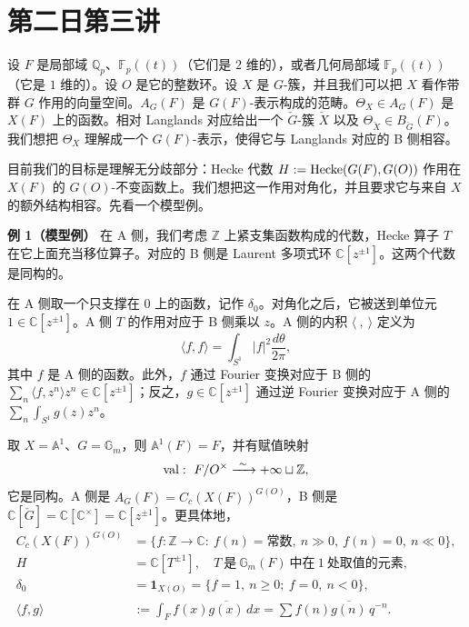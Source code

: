 \section{第二日第三讲}

设 $F$ 是局部域 $\mathbb Q_p$、$\mathbb F_p((t))$（它们是 $2$ 维的），或者几何局部域 $\mathbb F_p((t))$（它是 $1$ 维的）。设 $O$ 是它的整数环。设 $X$ 是 $G$-簇，并且我们可以把 $X$ 看作带群 $G$ 作用的向量空间。$A_G(F)$ 是 $G(F)$-表示构成的范畴。$\Theta_X\in A_G(F)$ 是 $X(F)$ 上的函数。相对 Langlands 对应给出一个 $\check G$-簇 $\check X$ 以及 $\Theta_{\check X}\in B_{\check G}(F)$。我们想把 $\Theta_X$ 理解成一个 $G(F)$-表示，使得它与 Langlands 对应的 B 侧相容。

目前我们的目标是理解无分歧部分：Hecke 代数 $H:=\operatorname{Hecke}(G(F),G(O))$ 作用在 $X(F)$ 的 $G(O)$-不变函数上。我们想把这一作用对角化，并且要求它与来自 $X$ 的额外结构相容。先看一个模型例。

\medskip
\noindent\textbf{例 1（模型例）}\enspace
在 A 侧，我们考虑 $\mathbb Z$ 上紧支集函数构成的代数，Hecke 算子 $T$ 在它上面充当移位算子。对应的 B 侧是 Laurent 多项式环 $\mathbb C[z^{\pm1}]$。这两个代数是同构的。

在 A 侧取一个只支撑在 $0$ 上的函数，记作 $\delta_0$。对角化之后，它被送到单位元 $1\in\mathbb C[z^{\pm1}]$。A 侧 $T$ 的作用对应于 B 侧乘以 $z$。A 侧的内积 $\langle\ ,\ \rangle$ 定义为
\[
  \langle f,f\rangle=\int_{S^1}|f|^2\frac{d\theta}{2\pi},
\]
其中 $f$ 是 A 侧的函数。此外，$f$ 通过 Fourier 变换对应于 B 侧的 $\sum_n\langle f,z^n\rangle z^n\in\mathbb C[z^{\pm1}]$；反之，$g\in\mathbb C[z^{\pm1}]$ 通过逆 Fourier 变换对应于 A 侧的 $\sum_n\int_{S^1}g(z)z^n$。

取 $X=\mathbb A^1$、$G=\mathbb G_m$，则 $\mathbb A^1(F)=F$，并有赋值映射
\[
  \val:\ F/O^\times\xrightarrow{\ \sim\ }+\infty\sqcup\mathbb Z,
\]
它是同构。A 侧是 $A_G(F)=C_c(X(F))^{G(O)}$，B 侧是 $\mathbb C[\check G]=\mathbb C[\mathbb C^\times]=\mathbb C[z^{\pm1}]$。更具体地，
\begin{align*}
  C_c(X(F))^{G(O)}&=\{f:\mathbb Z\to\mathbb C:\ f(n)=\text{常数},\ n\gg0,\ f(n)=0,\ n\ll0\},\\
  H&=\mathbb C[T^{\pm1}],\quad T\ \text{是}\ \mathbb G_m(F)\ \text{中在}\ 1\ \text{处取值的元素},\\
  \delta_0&=\mathbf 1_{X(O)}=\{f=1,\ n\ge0;\ f=0,\ n<0\},\\
  \langle f,g\rangle&:=\int_F f(x)\overline{g(x)}\,dx=\sum f(n)\overline{g(n)}\,q^{-n}.
\end{align*}

